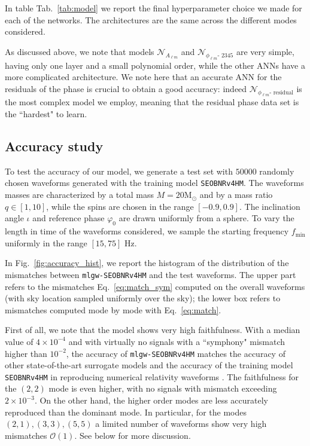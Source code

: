 \documentclass[twocolumn,showpacs,preprintnumbers,nofootinbib,prd,
superscriptaddress,10pt]{revtex4-2}
\begin{document}
In table Tab.~\ref{tab:model} we report the final hyperparameter choice we made for each of the networks. The architectures are the same across the different modes considered.

As discussed above, we note that models $\mathcal{N}_{A_{\ell m}}$ and $\mathcal{N}_{\phi_{\ell m}\text{- 2345}}$ are very simple, having only one layer and a small polynomial order, while the other ANNs have a more complicated architecture.
We note here that an accurate ANN for the residuals of the phase is crucial to obtain a good accuracy: indeed $\mathcal{N}_{\phi_{\ell m}\text{- residual}}$ is the most complex model we employ, meaning that the residual phase data set is the ``hardest" to learn.

\subsection{Accuracy study}\label{sec:accuracy}

To test the accuracy of our model, we generate a test set with $50000$ randomly chosen waveforms generated with the training model \texttt{SEOBNRv4HM}.
The waveforms masses are characterized by a total mass $M = 20 \textrm{M}_\odot$ and by a mass ratio $q \in [1, 10]$, while the spins are chosen in the range $[-0.9, 0.9]$. The inclination angle $\iota$ and reference phase $\varphi_0$ are drawn uniformly from a sphere.
To vary the length in time of the waveforms considered, we sample the starting frequency $f_\textrm{min}$ uniformly in the range $[15, 75]$ Hz.

In Fig.~\ref{fig:accuracy_hist}, we report the histogram of the distribution of the mismatches between \texttt{mlgw-SEOBNRv4HM} and the test waveforms. The upper part refers to the mismatches Eq.~\eqref{eq:match_sym} computed on the overall waveforms (with sky location sampled uniformly over the sky); the lower box refers to mismatches computed mode by mode with Eq.~\eqref{eq:match}.

First of all, we note that the model shows very high faithfulness. With a median value of $4\times 10^{-4}$ and with virtually no signals with a 
``symphony" mismatch higher than $10^{-2}$, the accuracy of \texttt{mlgw-SEOBNRv4HM} matches the accuracy of other state-of-the-art surrogate models \cite{Cotesta:2020qhw, Khan:2020fso, Gadre:2022sed} and the accuracy of the training model \texttt{SEOBNRv4HM} in reproducing numerical relativity waveforms \cite{Cotesta:2018fcv}.
The faithfulness for the $(2,2)$ mode is even higher, with no signals with mismatch exceeding $2\times 10^{-3}$.
On the other hand, the higher order modes are less accurately reproduced than the dominant mode. In particular, for the modes $(2,1), (3,3), (5,5)$ a limited number of waveforms show very high mismatches $\mathcal{O}(1)$. See below for more discussion.
\end{document}
